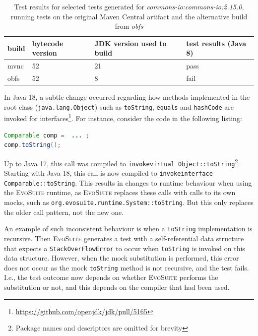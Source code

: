 \documentclass[conference]{IEEEtran}
\makeatletter
\newcommand{\evosuite}{\textsc{EvoSuite}\@\xspace}
\makeatother
\begin{document}
\begin{table}[h]
\caption{Test results for selected tests generated for  \textit{commons-io:commons-io:2.15.0}, running tests on the original Maven Central artifact and the alternative build from \textit{obfs}}
	\centering
	\begin{tabular}{p{1.2cm}p{1.2cm}p{1.7cm}p{1.3cm}}
		\toprule
		\textbf{build}         & \textbf{bytecode version} & \textbf{JDK version used to build} & \textbf{test results (Java 8)  }                                          \\ \midrule
		mvnc & 52       & 21                        & pass                                                                                        \\
		obfs         & 52               & 8                        & fail              \\ \bottomrule
	\end{tabular}
	
	\label{tab:stackoverflow}
\end{table}

In Java 18, a subtle change occurred regarding how methods implemented in the root class (\texttt{java.lang.Object}) such as \texttt{toString}, \texttt{equals} and \texttt{hashCode} are invoked for interfaces\footnote{\url{https://github.com/openjdk/jdk/pull/5165}}.
For instance, consider the code in the following listing:

\begin{lstlisting}[language=Java]
Comparable comp =  ... ; 
comp.toString();
\end{lstlisting}	

Up to Java 17, this call was compiled to \texttt{invokevirtual Object::toString}\footnote{Package names and descriptors are omitted for brevity}. Starting with Java 18, this call is now compiled to \texttt{invokeinterface Comparable::toString}. This results in changes to runtime behaviour when using the \evosuite runtime, as \evosuite replaces these calls with calls to its own mocks, such as  \texttt{org.evosuite.runtime.System::toString}. But this only replaces the older call pattern, not the new one. 

An example of such inconsistent behaviour is when a \texttt{toString} implementation is recursive. Then \evosuite generates a test with a self-referential data structure that expects a \texttt{StackOverFlowError} to occur when \texttt{toString} is invoked on this data structure. However, when the mock substitution is performed, this error does not occur as the mock \texttt{toString} method is not recursive, and the test fails. I.e., the test outcome now depends on whether \evosuite performs the substitution or not, and this depends on the compiler that had been used.
\end{document}
